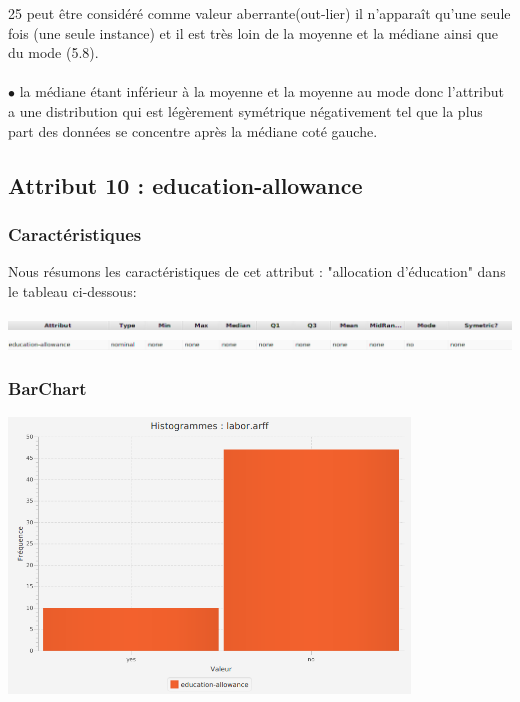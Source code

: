 \documentclass[12pt,a4paper,oneside]{book}
\begin{document}
25  peut être considéré comme valeur aberrante(out-lier) il n'apparaît qu'une seule fois (une seule instance) et il est très loin de la moyenne et la médiane ainsi que du mode (5.8).\\
\textbf{ }\\
$\bullet$ la médiane étant inférieur à la moyenne et la moyenne au mode  donc l'attribut a une distribution qui  est légèrement symétrique négativement tel que la plus part des données se concentre après la médiane coté gauche.


\newpage


\subsection{Attribut 10 : education-allowance}
\subsubsection{Caractéristiques}
Nous résumons les caractéristiques de cet attribut : "allocation d'éducation" dans le tableau ci-dessous:
\begin{center}
	\includegraphics[width=1\textwidth]{screens/att.png}\\ \includegraphics[width=1\textwidth]{screens/att-9.png}%
	\label{labelname}%
\end{center}

\subsubsection{BarChart}
\begin{center}
	\includegraphics[width=0.8\textwidth]{screens/barchart/education-allowance-barchart.png}%
	\label{labelname}%
\end{center}
\end{document}
